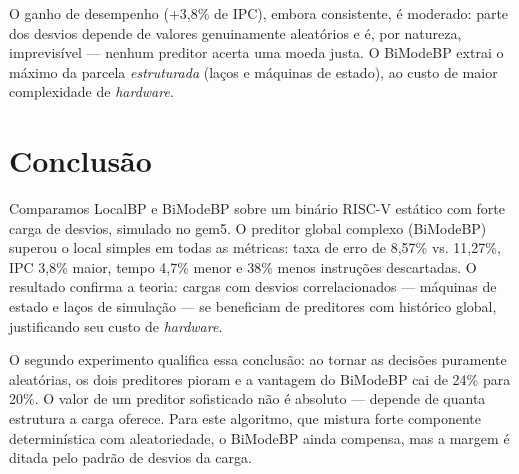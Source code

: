 \documentclass[12pt]{article}
\begin{document}
O ganho de desempenho (+3,8\% de IPC), embora consistente, é moderado:
parte dos desvios depende de valores genuinamente aleatórios e é, por
natureza, imprevisível --- nenhum preditor acerta uma moeda justa. O
BiModeBP extrai o máximo da parcela \emph{estruturada} (laços e máquinas
de estado), ao custo de maior complexidade de \emph{hardware}.

\section{Conclusão}

Comparamos LocalBP e BiModeBP sobre um binário RISC-V estático com forte
carga de desvios, simulado no gem5. O preditor global complexo (BiModeBP)
superou o local simples em todas as métricas: taxa de erro de 8,57\% vs.
11,27\%, IPC 3,8\% maior, tempo 4,7\% menor e 38\% menos instruções
descartadas. O resultado confirma a teoria: cargas com desvios
correlacionados --- máquinas de estado e laços de simulação --- se
beneficiam de preditores com histórico global, justificando seu custo de
\emph{hardware}.

O segundo experimento qualifica essa conclusão: ao tornar as decisões
puramente aleatórias, os dois preditores pioram e a vantagem do BiModeBP
cai de 24\% para 20\%. O valor de um preditor sofisticado não é absoluto
--- depende de quanta estrutura a carga oferece. Para este algoritmo, que
mistura forte componente determinística com aleatoriedade, o BiModeBP
ainda compensa, mas a margem é ditada pelo padrão de desvios da carga.



\end{document}
